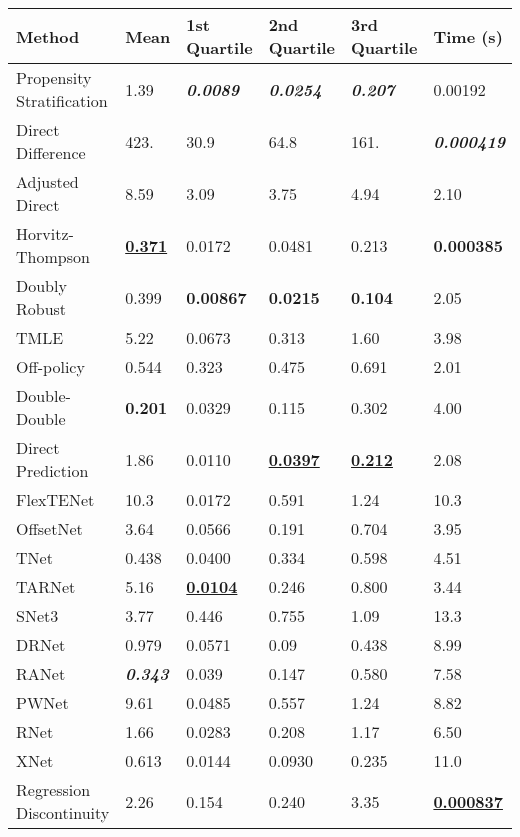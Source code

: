 \begin{tabular}{|l|l|l|l|l|l|}
  \hline
  \textbf{Method} & \textbf{Mean} & \textbf{1st Quartile} & \textbf{2nd Quartile} & \textbf{3rd Quartile} & \textbf{Time (s)} \\ \hline
Propensity Stratification & 1.39 & \textit{\textbf{0.0089}} & \textit{\textbf{0.0254}} & \textit{\textbf{0.207}} & 0.00192\\ \hline
Direct Difference & 423. & 30.9 & 64.8 & 161. & \textit{\textbf{0.000419}}\\ \hline
Adjusted Direct & 8.59 & 3.09 & 3.75 & 4.94 & 2.10\\ \hline
Horvitz-Thompson & \underline{\textbf{0.371}} & 0.0172 & 0.0481 & 0.213 & \textbf{0.000385}\\ \hline
Doubly Robust & 0.399 & \textbf{0.00867} & \textbf{0.0215} & \textbf{0.104} & 2.05\\ \hline
TMLE & 5.22 & 0.0673 & 0.313 & 1.60 & 3.98\\ \hline
Off-policy & 0.544 & 0.323 & 0.475 & 0.691 & 2.01\\ \hline
Double-Double & \textbf{0.201} & 0.0329 & 0.115 & 0.302 & 4.00\\ \hline
Direct Prediction & 1.86 & 0.0110 & \underline{\textbf{0.0397}} & \underline{\textbf{0.212}} & 2.08\\ \hline
FlexTENet & 10.3 & 0.0172 & 0.591 & 1.24 & 10.3\\ \hline
OffsetNet & 3.64 & 0.0566 & 0.191 & 0.704 & 3.95\\ \hline
TNet & 0.438 & 0.0400 & 0.334 & 0.598 & 4.51\\ \hline
TARNet & 5.16 & \underline{\textbf{0.0104}} & 0.246 & 0.800 & 3.44\\ \hline
SNet3 & 3.77 & 0.446 & 0.755 & 1.09 & 13.3\\ \hline
DRNet & 0.979 & 0.0571 & 0.09 & 0.438 & 8.99\\ \hline
RANet & \textit{\textbf{0.343}} & 0.039 & 0.147 & 0.580 & 7.58\\ \hline
PWNet & 9.61 & 0.0485 & 0.557 & 1.24 & 8.82\\ \hline
RNet & 1.66 & 0.0283 & 0.208 & 1.17 & 6.50\\ \hline
XNet & 0.613 & 0.0144 & 0.0930 & 0.235 & 11.0\\ \hline
Regression Discontinuity & 2.26 & 0.154 & 0.240 & 3.35 & \underline{\textbf{0.000837}}\\ \hline
\end{tabular}